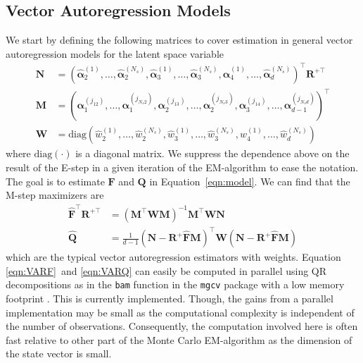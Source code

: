 \documentclass[notitlepage]{article}
\renewcommand{\vec}[1]{\bm{#1}}
\newcommand{\mat}[1]{\mathbf{#1}}
\newcommand{\Lparen}[1]{\left( #1\right)}
\newcommand{\optor}[2]{#1\Lparen{#2}}
\newcommand{\diag}[1]{\optor{\text{diag}}{#1}}
\newcommand{\partic}[3]{#1_{#2}^{\Lparen{#3}}}
\newcommand{\particS}[3]{\widehat{#1}_{#2}^{\Lparen{#3}}}
\newcommand{\nPart}{N}
\newcommand{\nPeriods}{d}
\begin{document}
\subsection{Vector Autoregression Models}\label{subsec:VAR}
We start by defining the following matrices to cover estimation in general vector autoregression models for the latent space variable %
%
\begin{align*}
\mat{N} &= \Lparen{
    	\particS{\vec{\alpha}}{2}{1},
    	\dots, 
    	\particS{\vec{\alpha}}{2}{\nPart_s}, 
    	\particS{\vec{\alpha}}{3}{1},
    	\dots, 
    	\particS{\vec{\alpha}}{3}{\nPart_s},
    	\particS{\vec{\alpha}}{4}{1},
    	\dots, 
   		\particS{\vec{\alpha}}{\nPeriods}{\nPart_s}
	}^\top\mat{R}^{+\top} \\
%
\mat{M} &= \Lparen{
    	\partic{\vec{\alpha}}{1}{j_{12}},
    	\dots, 
    	\partic{\vec{\alpha}}{1}{j_{\nPart_s2}}, 
    	\partic{\vec{\alpha}}{2}{j_{13}},
    	\dots, 
    	\partic{\vec{\alpha}}{2}{j_{\nPart_s3}},
    	\partic{\vec{\alpha}}{3}{j_{14}},
    	\dots, 
   		\partic{\vec{\alpha}}{\nPeriods - 1}{j_{\nPart_s\nPeriods}}
	}^\top \\
%
\mat{W} &= \diag{
		\particS{w}{2}{1}, \dots, \particS{w}{2}{\nPart_s},
		\particS{w}{3}{1}, \dots, \particS{w}{3}{\nPart_s},
		\particS{w}{4}{1}, \dots,\particS{w}{\nPeriods}{\nPart_s}
	}
\end{align*}%
% 
where $\diag{\cdot}$ is a diagonal matrix. We suppress the dependence above
 on the result of the E-step in 
a given iteration of the EM-algorithm to ease the notation. The goal is to estimate $\mat{F}$ and $\mat{Q}$ 
in Equation~\eqref{eqn:model}. We can find that the M-step maximizers are%
% 
\begin{align}
\widehat{\mat{F}}^\top\mat{R}^{+\top} &=
	\Lparen{\mat{M}^\top\mat{W}\mat{M}}^{-1}	
	\mat{M}^\top\mat{W}\mat{N} \label{eqn:VARF} \\
%
\widehat{\mat{Q}} &= 
	\frac{1}{\nPeriods - 1}
	\Lparen{\mat{N} - \mat{R}^+\widehat{\mat{F}}\mat{M}}^\top
	\mat{W}
	\Lparen{\mat{N} - \mat{R}^+\widehat{\mat{F}}\mat{M}} \label{eqn:VARQ}
\end{align}%
%
which are the typical vector autoregression estimators with weights. Equation \eqref{eqn:VARF}~and \eqref{eqn:VARQ} can easily be computed in parallel using QR decompositions as in the \texttt{bam} function in the \texttt{mgcv} package with a low memory footprint \citep[see][]{wood14}. This is currently implemented. Though, the gains from a parallel implementation may be small as the computational complexity 
is independent of the number of observations. Consequently, the computation involved here is often 
fast relative to other part of the Monte Carlo EM-algorithm 
as the dimension of the state vector is small.
\end{document}
